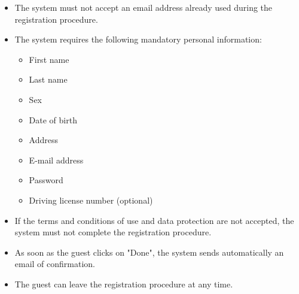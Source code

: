 \documentclass{article}
\begin{document}
	\begin{itemize}
		\item The system must not accept an email address already used during the registration procedure.
		\item The system requires the following mandatory personal information:
			\begin{itemize}
				\item First name
				\item Last name
				\item Sex
				\item Date of birth
				\item Address
				\item E-mail address
				\item Password
				\item Driving license number (optional)
			\end{itemize}
		\item If the terms and conditions of use and data protection are not accepted, the system must not complete the registration procedure.
		\item As soon as the guest clicks on "Done", the system sends automatically an email of confirmation.
		\item The guest can leave the registration procedure at any time.
	\end{itemize}
\end{document}
